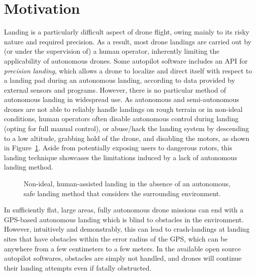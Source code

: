 \section{Motivation}

Landing is a particularly difficult aspect of drone flight,
owing mainly to its risky nature and required precision.
As a result, most drone landings are carried out by
(or under the supervision of)
a human operator,
inherently limiting the applicability of autonomous drones.
Some autopilot software includes an \gls{API} for \textit{precision landing},
which allows a drone to localize and direct itself with respect to a landing pad during an autonomous landing,
according to data provided by external sensors and programs.
However, there is no particular method of autonomous landing in widespread use.
As autonomous and semi-autonomous drones are not able to reliably handle landings
on rough terrain or in non-ideal conditions, human operators often disable
autonomous control during landing (opting for full manual control),
or abuse/hack the landing system by descending to a low altitude,
grabbing hold of the drone,
and disabling the motors,
as shown in Figure~\ref{figure:hand_landing}.
Aside from potentially exposing users to dangerous rotors,
this landing technique showcases the limitations induced by a lack of
autonomous landing method.

\begin{figure}[ht]
    \centering
    \begin{minipage}{\wd0}
      \caption{Non-ideal, human-assisted landing in the absence of an autonomous, safe landing method that considers the surrounding environment.}
      \label{figure:hand_landing}
    \end{minipage}
\end{figure}

In sufficiently flat, large areas, fully autonomous drone missions can end with a GPS-based
autonomous landing which is blind to obstacles in the environment.
However,
intuitively and demonstrably,
this can lead to crash-landings at landing sites that have obstacles within
the error radius of the GPS,
which can be anywhere from a few centimeters to a few meters.
In the available open source autopilot softwares,
obstacles are simply not handled,
and drones will continue their landing attempts even if fatally obstructed.